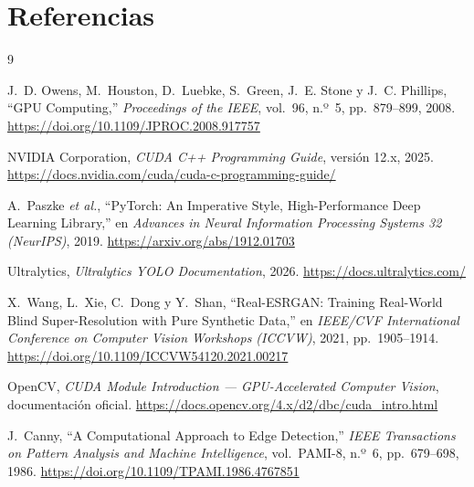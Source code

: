 \section*{Referencias}

\begin{thebibliography}{9}

J.~D. Owens, M.~Houston, D.~Luebke, S.~Green, J.~E. Stone y J.~C. Phillips,
``GPU Computing,'' \textit{Proceedings of the IEEE}, vol.~96, n.º~5,
pp.~879--899, 2008.
\url{https://doi.org/10.1109/JPROC.2008.917757}

NVIDIA Corporation, \textit{CUDA C++ Programming Guide}, versión 12.x, 2025.
\url{https://docs.nvidia.com/cuda/cuda-c-programming-guide/}

A.~Paszke \textit{et al.}, ``PyTorch: An Imperative Style, High-Performance
Deep Learning Library,'' en \textit{Advances in Neural Information Processing
Systems 32 (NeurIPS)}, 2019.
\url{https://arxiv.org/abs/1912.01703}

Ultralytics, \textit{Ultralytics YOLO Documentation}, 2026.
\url{https://docs.ultralytics.com/}

X.~Wang, L.~Xie, C.~Dong y Y.~Shan, ``Real-ESRGAN: Training Real-World Blind
Super-Resolution with Pure Synthetic Data,'' en \textit{IEEE/CVF International
Conference on Computer Vision Workshops (ICCVW)}, 2021, pp.~1905--1914.
\url{https://doi.org/10.1109/ICCVW54120.2021.00217}

OpenCV, \textit{CUDA Module Introduction --- GPU-Accelerated Computer Vision},
documentación oficial.
\url{https://docs.opencv.org/4.x/d2/dbc/cuda_intro.html}

J.~Canny, ``A Computational Approach to Edge Detection,'' \textit{IEEE
Transactions on Pattern Analysis and Machine Intelligence}, vol.~PAMI-8,
n.º~6, pp.~679--698, 1986.
\url{https://doi.org/10.1109/TPAMI.1986.4767851}

\end{thebibliography}
